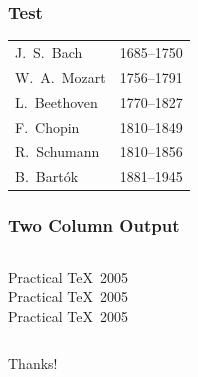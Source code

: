 \documentclass{beamer}
\begin{document}
\begin{frame}
    \frametitle{Test}
    \begin{center}
        \begin{tabular}{|l|c|}\hline
            J.\ S.\ Bach   & 1685--1750 \\
            W.\ A.\ Mozart & 1756--1791 \\
            L.\ Beethoven  & 1770--1827 \\
            F.\ Chopin     & 1810--1849 \\
            R.\ Schumann   & 1810--1856 \\
            B.\ Bart\'{o}k & 1881--1945 \\ \hline
        \end{tabular}
    \end{center}
\end{frame}

\begin{frame}
    \frametitle{Two Column Output}
    \begin{columns}[c]
        Practical \TeX\ 2005\\
        Practical \TeX\ 2005\\
        Practical \TeX\ 2005
    \end{columns}
\end{frame}

\begin{frame}
    \Huge Thanks!
\end{frame}
\end{document}
